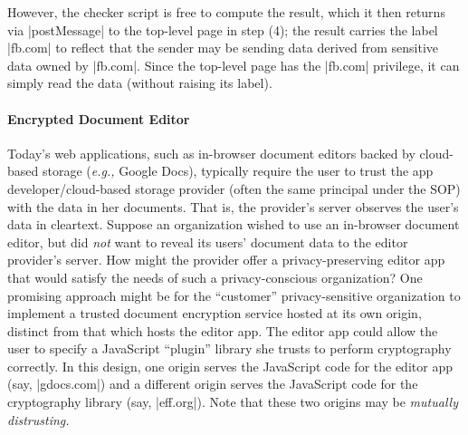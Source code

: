 %
However, the checker script is free to compute the result, which
it then returns via \js|postMessage| to the top-level page in step (4); the
result carries the label \js|fb.com| to reflect that the sender may be
sending data derived from sensitive data owned by \js|fb.com|.
%
Since the top-level page has the \js|fb.com| privilege, it can simply
read the data (without raising its label).

\paragraph{Encrypted Document Editor}
Today's web applications, such as in-browser document editors backed
by cloud-based storage (\emph{e.g.,} Google Docs), typically require the user
to trust the app developer/cloud-based storage provider (often the
same principal under the SOP) with the data in her documents. That is,
the provider's server observes the user's data in cleartext. Suppose
an organization wished to use an in-browser document editor, but did
{\em not} want to reveal its users' document data to the editor
provider's server. How might the provider offer a privacy-preserving
editor app that would satisfy the needs of such a privacy-conscious
organization?  One promising approach might be for the ``customer''
privacy-sensitive organization to implement a trusted document encryption
service hosted at its own origin, distinct from that which hosts the
editor app. The editor app could allow the user to specify a JavaScript
``plugin'' library she trusts to perform cryptography correctly. In this design,
one origin serves the JavaScript code for the editor app (say,
\js|gdocs.com|) and a different origin serves the JavaScript code for
the cryptography library (say, \js|eff.org|). Note that these two
origins may be {\em mutually distrusting.}
